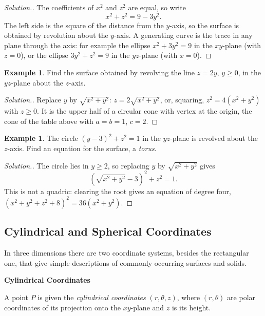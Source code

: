 \documentclass[11pt,a4paper]{article}
\theoremstyle{definition}
\newtheorem{exa}[thm]{Example}
\newenvironment{solution}
  {\renewcommand{\qedsymbol}{}\begin{proof}[\textit{Solution}.]}
  {\end{proof}}
\newcommand{\subhead}[1]{%
  \par\medskip\noindent\textbf{#1}\par\nobreak\smallskip}
\begin{document}
\begin{solution}
The coefficients of $x^2$ and $z^2$ are equal, so write
\[x^2 + z^2 = 9 - 3y^2 .\]
The left side is the square of the distance from the $y$-axis, so the surface is
obtained by revolution about the $y$-axis. A generating curve is the trace in
any plane through the axis: for example the ellipse $x^2 + 3y^2 = 9$ in the
$xy$-plane (with $z = 0$), or the ellipse $3y^2 + z^2 = 9$ in the $yz$-plane
(with $x = 0$).
\end{solution}

\begin{exa}
\label{ex:revolveline}
Find the surface obtained by revolving the line $z = 2y$, $y\geq 0$, in the
$yz$-plane about the $z$-axis.
\end{exa}

\begin{solution}
Replace $y$ by $\sqrt{x^2 + y^2}$: $z = 2\sqrt{x^2 + y^2}$, or, squaring,
$z^2 = 4(x^2 + y^2)$ with $z\geq 0$. It is the upper half of a circular cone with
vertex at the origin, the cone of the table above with $a = b = 1$, $c = 2$.
\end{solution}

\begin{exa}
\label{ex:torus}
The circle $(y - 3)^2 + z^2 = 1$ in the $yz$-plane is revolved about the
$z$-axis. Find an equation for the surface, a \emph{torus}.
\end{exa}

\begin{solution}
The circle lies in $y\geq 2$, so replacing $y$ by $\sqrt{x^2 + y^2}$ gives
\[\left(\sqrt{x^2 + y^2} - 3\right)^2 + z^2 = 1 .\]
This is not a quadric: clearing the root gives an equation of degree four,
$(x^2 + y^2 + z^2 + 8)^2 = 36(x^2 + y^2)$.
\end{solution}

{\color[wave]{485}\subsection{Cylindrical and Spherical Coordinates}}

In three dimensions there are two coordinate systems, besides the rectangular
one, that give simple descriptions of commonly occurring surfaces and solids.

\subhead{Cylindrical Coordinates}

A point $P$ is given the \emph{cylindrical coordinates} $(r,\theta,z)$, where
$(r,\theta)$ are polar coordinates of its projection onto the $xy$-plane and $z$
is its height.
\end{document}
